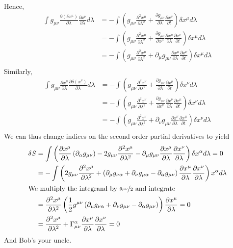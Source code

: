 \documentclass{article}
\begin{document}
	Hence,
	\begin{align*}
		\int g_{\mu \nu} \frac{\partial (\delta x^\mu)}{\partial \lambda} \frac{\partial x^\nu}{\partial \lambda}d \lambda &= - \int \left ( g_{\mu \nu} \frac{\partial^2 x^\mu}{\partial \lambda^2} + \frac{\partial g_{\mu\nu}}{\partial\lambda} \frac{\partial x^\nu}{\partial t} \right) \delta x^\mu d\lambda \\
		&= 
		- \int \left ( g_{\mu \nu} \frac{\partial^2 x^\mu}{\partial \lambda^2} + \frac{\partial g_{\mu\nu}}{\partial x^\mu} \frac{\partial x^\mu}{\partial \lambda} \frac{\partial x^\nu}{\partial t} \right) \delta x^\mu d\lambda \\
		&=- \int \left ( g_{\mu \nu} \frac{\partial^2 x^\mu}{\partial \lambda^2} + \partial_\mu g_{\mu\nu} \frac{\partial x^\mu}{\partial \lambda} \frac{\partial x^\nu}{\partial t} \right) \delta x^\mu d\lambda \\
	\end{align*}
	Similarly, 
	\begin{align*}
		\int g_{\mu \nu} \frac{\partial x^\mu}{\partial \lambda} \frac{\partial \delta (x^\nu)}{\partial \lambda}d \lambda &= - \int \left ( g_{\mu \nu} \frac{\partial^2 x^\nu}{\partial \lambda^2} + \frac{\partial g_{\mu\nu}}{\partial\lambda} \frac{\partial x^\mu}{\partial t} \right) \delta x^\nu d\lambda \\
		&= 
		- \int \left ( g_{\mu \nu} \frac{\partial^2 x^\nu}{\partial \lambda^2} + \frac{\partial g_{\mu\nu}}{\partial x^\nu} \frac{\partial x^\nu}{\partial \lambda} \frac{\partial x^\mu}{\partial t} \right) \delta x^\nu d\lambda \\
		&=- \int \left ( g_{\mu \nu} \frac{\partial^2 x^\nu}{\partial \lambda^2} + \partial_\nu g_{\mu\nu} \frac{\partial x^\nu}{\partial \lambda} \frac{\partial x^\mu}{\partial t} \right) \delta x^\nu d\lambda \\
	\end{align*}
	We can thus change indices on the second order partial derivatives to yield
	\begin{align*}
		\delta S &= \int \left( \frac{\partial x^\mu}{\partial \lambda} \left( \partial_\alpha  g_{\mu \nu} \right) - 2g_{\mu \nu} \frac{\partial^2 x^\mu}{\partial \lambda^2} - \partial_\mu g_{\mu\nu} \frac{\partial x^\mu}{\partial \lambda} \frac{\partial x^\nu}{\partial \lambda} \right) \delta x^\alpha d\lambda = 0 \\
		&= - \int \left( 2g_{\mu\nu} \frac{\partial^2 x^\mu}{\partial \lambda^2} + \left( \partial_\mu g _{\nu \alpha}+ \partial_\nu g_{\mu \alpha } - \partial_\alpha g_{\mu \nu} \right) \frac{\partial x^\mu}{\partial \lambda}\frac{\partial x^\nu}{\partial \lambda} \right)x^\alpha d\lambda  \\
		\intertext{We multiply the integrand by $\nicefrac{g_{\mu \nu}}{2}$ and integrate}
		&= \frac{\partial^2 x^\mu}{\partial \lambda^2} \left( \frac{1}{2}g^{\mu\nu} \left( \partial_\mu g_{\nu\alpha} + \partial_{\nu} g_{\mu \nu} - \partial_{\alpha} g_{\mu \nu} \right) \right) \frac{\partial x^\mu}{\partial \lambda} = 0 \\
		&= \frac{\partial^2 x^\mu}{\partial \lambda^2} + \Gamma_{\mu\nu}^\alpha \frac{\partial x^\mu}{\partial \lambda}\frac{\partial x^\nu}{\partial \lambda} = 0
	\end{align*}
	And Bob's your uncle.
	\pagebreak
\end{document}
